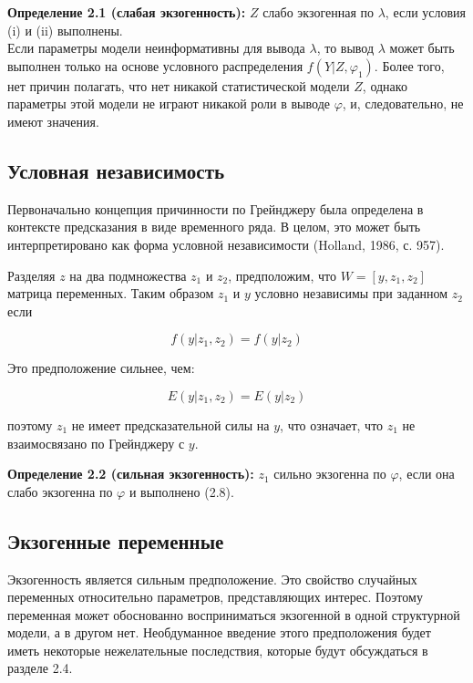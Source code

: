 {\bf Определение 2.1 (слабая экзогенность):}  $Z$ слабо экзогенная по $\lambda$, если условия (i) и (ii) выполнены.\\
	Если параметры модели неинформативны для вывода $\lambda$, то вывод $\lambda $  может быть выполнен только на основе условного распределения $f(Y|Z,\varphi_{1})$. Более того, нет причин полагать, что нет никакой статистической модели $Z$, однако параметры этой модели не играют никакой роли в выводе $\varphi$, и, следовательно, не имеют значения. \\


\subsection{Условная независимость}


Первоначально концепция причинности по Грейнджеру была определена в контексте предсказания в виде временного ряда. В целом, это может быть интерпретировано как форма условной независимости (Holland, 1986, с. 957). 


	Разделяя $z$ на два подмножества $z_{1}$ и $z_{2}$, предположим, что $W=[y,z_{1},z_{2}]$ матрица переменных. Таким образом $z_{1}$ и $y$ условно независимы при заданном $z_{2}$ если

\begin{equation}
f(y|z_{1},z_{2})=f(y|z_{2})
\end{equation}

Это предположение сильнее, чем:
 
\begin{equation}
E(y|z_{1},z_{2})=E(y|z_{2})
\end{equation}

поэтому $z_{1}$ не имеет предсказательной силы на $y$, что означает, что $z_{1}$ не взаимосвязано по Грейнджеру с $y$.

{\bf Определение 2.2 (сильная экзогенность):}  $z_{1}$ сильно экзогенна по $\varphi$, если она слабо экзогенна по $\varphi$ и выполнено (2.8).

\subsection{Экзогенные переменные}


	Экзогенность является сильным предположение. Это свойство случайных переменных относительно параметров, представляющих интерес. Поэтому переменная может обоснованно восприниматься экзогенной в одной структурной модели, а в другом нет. Необдуманное введение этого предположения будет иметь некоторые нежелательные последствия, которые будут обсуждаться в разделе 2.4. 
	
